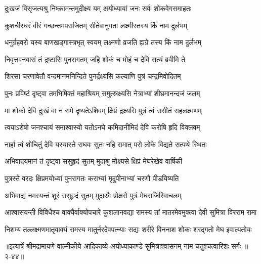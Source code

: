 \twolineshloka
{दुःखजं विसृजत्यश्रु निष्क्रामन्तमुदीक्ष्य यम्}
{अयोध्यायां जनः सर्वः शोकवेगसमाहतः} %

\twolineshloka
{कुशचीरधरं वीरं गच्छन्तमपराजितम्}
{सीतेवानुगता लक्ष्मीस्तस्य किं नाम दुर्लभम्} %

\twolineshloka
{धनुर्ग्रहवरो यस्य बाणखड्गास्त्रभृत् स्वयम्}
{लक्ष्मणो व्रजति ह्यग्रे तस्य किं नाम दुर्लभम्} %

\twolineshloka
{निवृत्तवनवासं तं द्रष्टासि पुनरागतम्}
{जहि शोकं च मोहं च देवि सत्यं ब्रवीमि ते} %

\twolineshloka
{शिरसा चरणावेतौ वन्दमानमनिन्दिते}
{पुनर्द्रक्ष्यसि कल्याणि पुत्रं चन्द्रमिवोदितम्} %

\twolineshloka
{पुनः प्रविष्टं दृष्ट्वा तमभिषिक्तं महाश्रियम्}
{समुत्स्रक्ष्यसि नेत्राभ्यां शीघ्रमानन्दजं जलम्} %

\twolineshloka
{मा शोको देवि दुःखं वा न रामे दृष्यतेऽशिवम्}
{क्षिप्रं द्रक्ष्यसि पुत्रं त्वं ससीतं सहलक्ष्मणम्} %

\twolineshloka
{त्वयाऽशेषो जनश्चायं समाश्वास्यो यतोऽनघे}
{कमिदानीमिदं देवि करोषि हृदि विक्लवम्} %

\twolineshloka
{नार्हा त्वं शोचितुं देवि यस्यास्ते राघवः सुतः}
{नहि रामात् परो लोके विद्यते सत्पथे स्थितः} %

\twolineshloka
{अभिवादयमानं तं दृष्ट्वा ससुहृदं सुतम्}
{मुदाश्रु मोक्ष्यसे क्षिप्रं मेघरेखेव वार्षिकी} %

\twolineshloka
{पुत्रस्ते वरदः क्षिप्रमयोध्यां पुनरागतः}
{कराभ्यां मृदुपीनाभ्यां चरणौ पीडयिष्यति} %

\twolineshloka
{अभिवाद्य नमस्यन्तं शूरं ससुहृदं सुतम्}
{मुदास्रैः प्रोक्षसे पुत्रं मेघराजिरिवाचलम्} %

\twolineshloka
{आश्वासयन्ती विविधैश्च वाक्यैर्वाक्योपचारे कुशलानवद्या}
{रामस्य तां मातरमेवमुक्त्वा देवी सुमित्रा विरराम रामा} %

\twolineshloka
{निशम्य तल्लक्ष्मणमातृवाक्यं रामस्य मातुर्नरदेवपत्न्याः}
{सद्यः शरीरे विननाश शोकः शरद्गतो मेघ इवाल्पतोयः} %


॥इत्यार्षे श्रीमद्रामायणे वाल्मीकीये आदिकाव्ये अयोध्याकाण्डे सुमित्राश्वासनम् नाम चतुश्चत्वारिंशः सर्गः ॥२-४४॥
